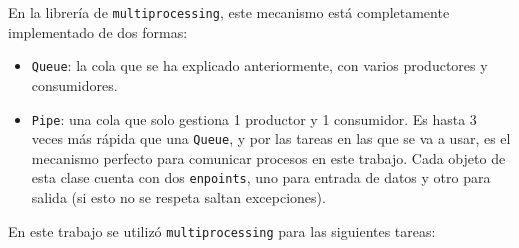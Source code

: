 En la librería de \texttt{multiprocessing}, este mecanismo está completamente implementado de dos formas:
\begin{itemize}
    \item \texttt{Queue}: la cola que se ha explicado anteriormente, con varios productores y consumidores.
    \item \texttt{Pipe}: una cola que solo gestiona 1 productor y 1 consumidor. Es hasta 3 veces más rápida que una \texttt{Queue}, y por las tareas en las que se va a usar, es el mecanismo perfecto 
    para comunicar procesos en este trabajo. Cada objeto de esta clase cuenta con dos \texttt{enpoints}, uno para entrada de datos y otro para salida (si esto no se respeta saltan excepciones).
\end{itemize}
\clearpage
En este trabajo se utilizó \texttt{multiprocessing} para las siguientes tareas:
